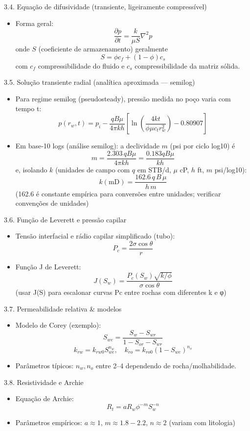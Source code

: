 \documentclass[11pt,a4paper]{article}
\begin{document}
3.4. Equação de difusividade (transiente, ligeiramente compressível)
\begin{itemize}
\item Forma geral:
$$\dfrac{\partial p}{\partial t}=\dfrac{k}{\mu S} \nabla^2 p$$
onde $S$ (coeficiente de armazenamento) geralmente
$$S=\phi c_f + (1-\phi)c_s$$
com $c_f$ compressibilidade do fluido e $c_s$ compressibilidade da matriz sólida.
\end{itemize}

3.5. Solução transiente radial (analítica aproximada — semilog)
\begin{itemize}
\item Para regime semilog (pseudosteady), pressão medida no poço varia com tempo t:
$$p(r_w,t)=p_i - \dfrac{q B \mu}{4\pi k h}\left[\ln\left(\dfrac{4 k t}{\phi \mu c_t r_w^2}\right)-0.80907\right]$$
\item Em base‑10 logs (análise semilog): a declividade $m$ (psi por ciclo log10) é
$$m=\dfrac{2.303\,q B \mu}{4\pi k h} = \dfrac{0.183 q B \mu}{k h}$$
  e, isolando $k$ (unidades de campo com $q$ em STB/d, $\mu$ cP, $h$ ft, $m$ psi/log10):
$$k(\text{mD}) = \dfrac{162.6\,q\,B\,\mu}{h\,m}$$
(162.6 é constante empírica para conversões entre unidades; verificar convenções de unidades)
\end{itemize}

3.6. Função de Leverett e pressão capilar
\begin{itemize}
\item Tensão interfacial e rádio capilar simplificado (tubo):
$$P_c=\dfrac{2\sigma \cos\theta}{r}$$
\item Função J de Leverett:
$$J(S_w)=\dfrac{P_c(S_w)\sqrt{k/\phi}}{\sigma\cos\theta}$$
(usar J(S) para escalonar curvas Pc entre rochas com diferentes k e φ)
\end{itemize}

3.7. Permeabilidade relativa \& modelos
\begin{itemize}
\item Modelo de Corey (exemplo):
$$S_{we}=\dfrac{S_w-S_{wr}}{1-S_{or}-S_{wr}}$$
$$k_{rw}=k_{rw0} S_{we}^{n_w},\quad k_{ro}=k_{ro0}(1-S_{we})^{n_o}$$
\item Parâmetros típicos: $n_w, n_o$ entre 2–4 dependendo de rocha/molhabilidade.
\end{itemize}

3.8. Resistividade e Archie
\begin{itemize}
\item Equação de Archie:
$$R_t = a R_w \phi^{-m} S_w^{-n}$$
\item Parâmetros empíricos: $a\approx1$, $m\approx1.8-2.2$, $n\approx2$ (variam com litologia)
\end{itemize}
\end{document}
